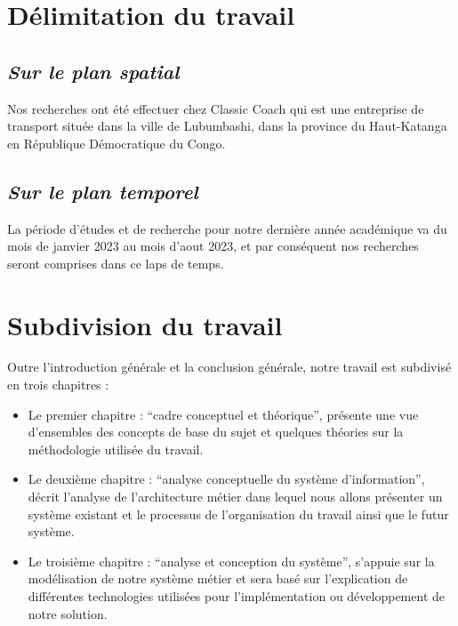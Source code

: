     \section[Délimitation du travail]{Délimitation du travail}
        \subsection[Sur le plan spatial]{\textit{Sur le plan spatial}}
        Nos recherches ont été effectuer chez Classic Coach qui est une entreprise de transport
        située dans la ville de Lubumbashi, dans la province du Haut-Katanga en République Démocratique du Congo.
        \subsection[Sur le plan temporel]{\textit{Sur le plan temporel}}
        La période d’études et de recherche pour notre dernière 
        année académique va du mois de janvier 2023 au mois d’aout 2023,
        et par conséquent nos recherches seront comprises dans ce laps de temps.
    \section[Subdivision du travail]{Subdivision du travail}
    Outre l’introduction générale et la conclusion générale, notre travail est subdivisé
    en trois chapitres :
    \par
        \begin{itemize}
            \setlength{\itemsep}{0pt}
            \item [\ding{226}] Le premier chapitre : \enquote{cadre conceptuel et théorique}, présente une vue
            d’ensembles des concepts de base du sujet et quelques théories sur la méthodologie
            utilisée du travail.
            \item [\ding{226}] Le deuxième chapitre : \enquote{analyse conceptuelle du système d’information}, 
            décrit l’analyse de l’architecture métier dans lequel nous allons présenter un système existant
            et le processus de l’organisation du travail ainsi que le futur système.
            \item [\ding{226}] Le troisième chapitre : \enquote{analyse et conception du système}, s’appuie sur la
            modélisation de notre système métier et sera basé sur l’explication de différentes
            technologies utilisées pour l’implémentation ou développement de notre solution.          
        \end{itemize} 
